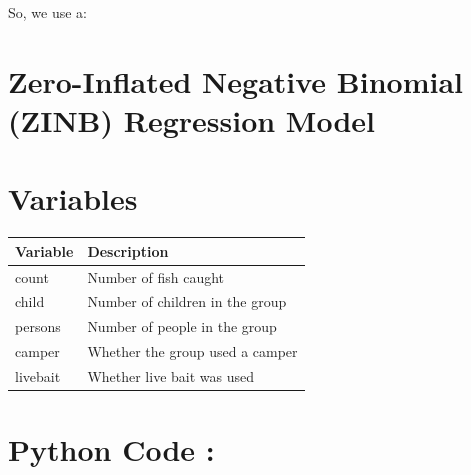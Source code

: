 \documentclass[
]{article}
\newcounter{none} %
\begin{document}
So, we use a:

\section{Zero-Inflated Negative Binomial (ZINB) Regression
Model}\label{zero-inflated-negative-binomial-zinb-regression-model}

\section{Variables}\label{variables}

{\def\LTcaptype{none} %
\begin{longtable}[]{@{}
  >{\raggedright\arraybackslash}p{}
  >{\raggedright\arraybackslash}p{}@{}}
\toprule\noalign{}
\begin{minipage}[b]{\linewidth}\raggedright
\textbf{Variable}
\end{minipage} & \begin{minipage}[b]{\linewidth}\raggedright
\textbf{Description}
\end{minipage} \\
\midrule\noalign{}
\endhead
\bottomrule\noalign{}
\endlastfoot
count & Number of fish caught \\
child & Number of children in the group \\
persons & Number of people in the group \\
camper & Whether the group used a camper \\
livebait & Whether live bait was used \\
\end{longtable}
}

\section{\texorpdfstring{\textbf{Python Code}
:}{Python Code :}}\label{python-code-14}
\end{document}
